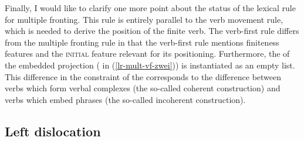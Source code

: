 Finally, I would like to clarify one more point about the status of the lexical rule for multiple fronting. This rule is
entirely parallel to the verb movement rule, which is needed to derive the position of the finite verb. The verb-first rule
differs from the multiple fronting rule in that the verb-first rule mentions finiteness features and
the \textsc{initial} feature
relevant for its positioning. Furthermore, the \compsl of the embedded projection ( in (\ref{lr-mult-vf-zwei})) is
instantiated as an empty list. This difference in the constraint of the \compsl corresponds to the difference between verbs
which form verbal complexes (the so-called coherent construction) and verbs which embed phrases (the
so-called incoherent construction).  

\begin{comment}
\section{Probleme}

Jacobs Negation: Neg CP

Ich kann Neg XP V nicht ausschließen und kriege immer Skopus über das am tiefsten eingebettete Verb. (darauf hat mich
Tibor hingewiesen).


Allerdings ist das folgende sicher nicht

Adv Neg CP sondern Adv Neg NP V

[Sicher] [nicht] [die letzte Aktion der BAW in diesem Zusammenhang] war am 30.\ Mai eine
      zweite Durchsuchung des Mehringhofes, bei der nochmals nach dem angeblichen Sprengstoffversteck
      gesucht wurde.



Nur die Maria, die liebt jeder.

\end{comment}


\subsection{Left dislocation}
\label{sec-left-dislocation}

